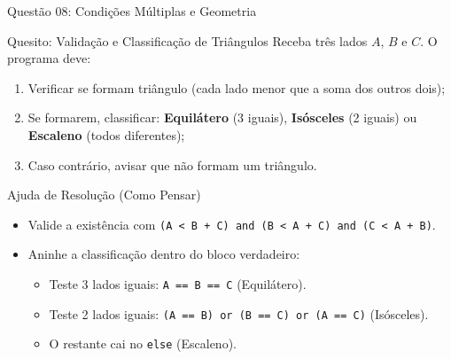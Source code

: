 \begin{frame}{Questão 08: Condições Múltiplas e Geometria}
    \begin{block}{Quesito: Validação e Classificação de Triângulos}
        Receba três lados $A$, $B$ e $C$. O programa deve:
        \begin{enumerate}
            \item Verificar se formam triângulo (cada lado menor que a soma dos outros dois);
            \item Se formarem, classificar: \textbf{Equilátero} (3 iguais), \textbf{Isósceles} (2 iguais) ou \textbf{Escaleno} (todos diferentes);
            \item Caso contrário, avisar que não formam um triângulo.
        \end{enumerate}
    \end{block}

    \begin{exampleblock}{Ajuda de Resolução (Como Pensar)}
        \begin{itemize}
            \item Valide a existência com \texttt{(A < B + C) and (B < A + C) and (C < A + B)}.
            \item Aninhe a classificação dentro do bloco verdadeiro:
            \begin{itemize}
                \item Teste 3 lados iguais: \texttt{A == B == C} (Equilátero).
                \item Teste 2 lados iguais: \texttt{(A == B) or (B == C) or (A == C)} (Isósceles).
                \item O restante cai no \texttt{else} (Escaleno).
            \end{itemize}
        \end{itemize}
    \end{exampleblock}
\end{frame}

